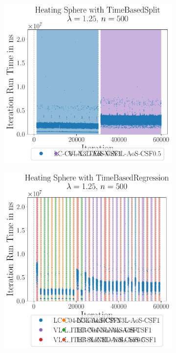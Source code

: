 \begin{figure}[htpb]
	\begin{subfigure}[c]{0.5\textwidth}
		\centering
		\includegraphics[width=\textwidth]{./Figures/plots/heating-sphere_configs_good.pdf}
	\end{subfigure}
	\begin{subfigure}[c]{0.5\textwidth}
		\centering
		\includegraphics[width=\textwidth]{./Figures/plots/heating-sphere_configs_bad.pdf}

\end{subfigure}
\end{figure}
